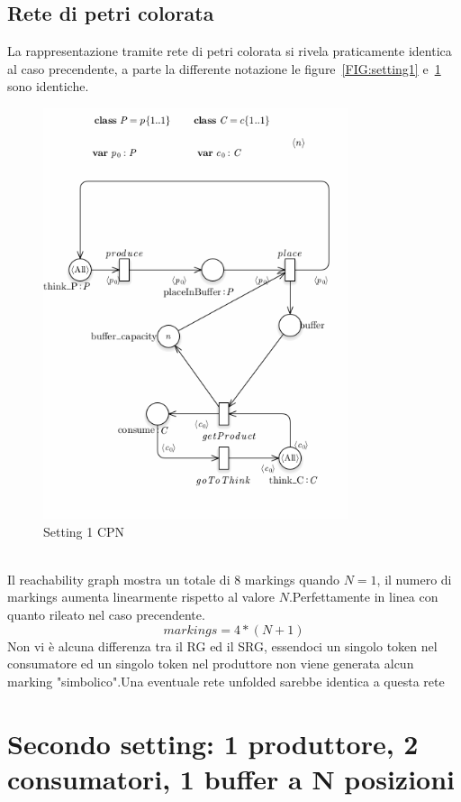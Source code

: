 \documentclass{article}
\begin{document}
\subsection{Rete di petri colorata}
La rappresentazione tramite rete di petri colorata si rivela praticamente identica al caso precendente, a parte la differente notazione le figure~\ref{FIG:setting1} e~\ref{FIG:setting1_CPN} sono identiche.
\begin{figure}[!ht]
\centering
\includegraphics[width=0.8\textwidth]{./Esercizio2_img/setting_1_CPN.png}
\caption{Setting 1 CPN} \label{FIG:setting1_CPN}
\end{figure}\\
Il reachability graph mostra un totale di 8 markings quando $N =1$, il numero di markings aumenta linearmente rispetto al valore $N$.Perfettamente in linea con quanto rileato nel caso precendente.
$$markings = 4*(N + 1)$$
Non vi è alcuna differenza tra il RG ed il SRG, essendoci un singolo token nel consumatore ed un singolo token nel produttore non viene generata alcun marking "simbolico".Una eventuale rete unfolded sarebbe identica a questa rete
\newpage
\section{Secondo  setting: 1 produttore, 2 consumatori,  1 buffer a N posizioni}\label{SEC:secondo}
\end{document}
